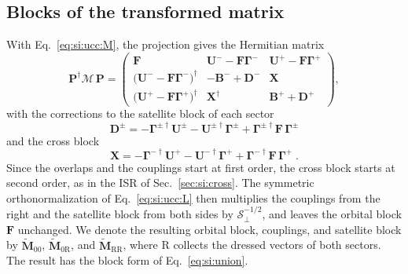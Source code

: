 \documentclass[aip,jcp,reprint,noshowkeys,superscriptaddress]{revtex4-2}
\theoremstyle{plain}
\theoremstyle{definition}
\theoremstyle{remark}
\begin{document}
\subsection{Blocks of the transformed matrix}
With Eq.~\eqref{eq:si:ucc:M}, the projection gives the Hermitian matrix
\begin{equation}
\mathbf{P}^\dagger\mathcal{M}\,\mathbf{P}=
\begin{pmatrix}
\mathbf{F} & \mathbf{U}^{-}-\mathbf{F}\pmb{\Gamma}^{-} & \mathbf{U}^{+}-\mathbf{F}\pmb{\Gamma}^{+}\\
\big(\mathbf{U}^{-}-\mathbf{F}\pmb{\Gamma}^{-}\big)^\dagger & -\mathbf{B}^{-}+\mathbf{D}^{-} & \mathbf{X}\\
\big(\mathbf{U}^{+}-\mathbf{F}\pmb{\Gamma}^{+}\big)^\dagger & \mathbf{X}^\dagger & \mathbf{B}^{+}+\mathbf{D}^{+}
\end{pmatrix} ,
\label{eq:si:ucc:PMP}
\end{equation}
with the corrections to the satellite block of each sector
\begin{equation}
\mathbf{D}^{\pm}=-\pmb{\Gamma}^{\pm\dagger}\mathbf{U}^{\pm}-\mathbf{U}^{\pm\dagger}\pmb{\Gamma}^{\pm}+\pmb{\Gamma}^{\pm\dagger}\mathbf{F}\,\pmb{\Gamma}^{\pm}
\label{eq:si:ucc:D}
\end{equation}
and the cross block
\begin{equation}
\mathbf{X}=-\pmb{\Gamma}^{-\dagger}\mathbf{U}^{+}-\mathbf{U}^{-\dagger}\pmb{\Gamma}^{+}+\pmb{\Gamma}^{-\dagger}\mathbf{F}\,\pmb{\Gamma}^{+} \;.
\label{eq:si:ucc:X}
\end{equation}
Since the overlaps and the couplings start at first order, the cross block starts at second order, as in the ISR of Sec.~\ref{sec:si:cross}. The symmetric orthonormalization of Eq.~\eqref{eq:si:ucc:L} then multiplies the couplings from the right and the satellite block from both sides by $\mathcal{S}_\perp^{-1/2}$, and leaves the orbital block $\mathbf{F}$ unchanged. We denote the resulting orbital block, couplings, and satellite block by $\tilde{\mathbf{M}}_{00}$, $\tilde{\mathbf{M}}_{0\mathrm{R}}$, and $\tilde{\mathbf{M}}_{\mathrm{RR}}$, where R collects the dressed vectors of both sectors. The result has the block form of Eq.~\eqref{eq:si:union}.
\end{document}
